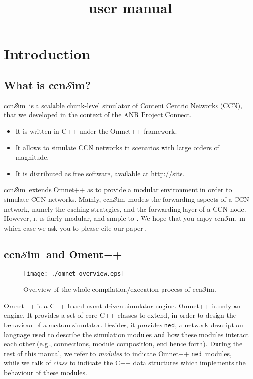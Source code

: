 \documentclass{book}
\title{\ccnsim\ user manual}
\newcommand{\ccnsim}{ccn$\mathcal{S}$im}
\newcommand{\ned}{\texttt{ned}}
\begin{document}
\maketitle
\tableofcontents
\chapter{Introduction}
\section{What is \ccnsim?}
\ccnsim\ is a scalable chunk-level simulator of Content Centric Networks (CCN)\cite{jacobson09conext}, that we developed in the context of the ANR Project Connect.  

\begin{itemize}
    \item It is written in C++ under the Omnet++ framework.
    \item It allows to simulate CCN networks in scenarios with large orders of magnitude.
    \item It is distributed as free software, available at \url{http://site}.
\end{itemize}
\ccnsim\ extends Omnet++ as to provide a modular environment in order to simulate CCN networks. Mainly,  \ccnsim\ models the forwarding aspects of a CCN network, namely the caching strategies, and the forwarding layer of a CCN node. However, it is fairly modular, and simple to . We hope that you enjoy \ccnsim\, in which case we ask you to please cite our paper \cite{ccn12icc}. 
\section{\ccnsim\ and Oment++}
\begin{figure}[t]
    \begin{center}
	\texttt{[image: ./omnet\_overview.eps]}
    \end{center}
    \caption{Overview of the whole compilation/execution process of \ccnsim. }
    \label{fig:omnet}
\end{figure}

Omnet++ is a C++ based event-driven simulator engine. Omnet++ is only an engine. It provides a set of core C++ classes to extend, in order to design the behaviour of a custom simulator.  Besides, it provides \ned,  a network description language   used  to describe the simulation modules and how these modules interact each other (e.g., connections, module composition, end hence forth). During the rest of this manual, we refer to \emph{modules} to indicate Omnet++ \ned\ modules, while we talk of  \emph{class} to indicate the C++ data structures which implements the behaviour of these modules. 
\end{document}
